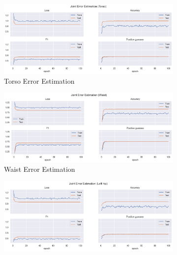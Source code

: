 \begin{figure}[!ht]
  \centering
  \begin{subfigure}[b]{0.47\linewidth}
      \centering
      \includegraphics[width=\textwidth]{figures/Results/v1_bs_60_is_64_e_100/jt/Torso_ErrorEstimation.png}
      \caption{Torso Error Estimation}
      \label{fig:v1_torso_jt_ee}
  \end{subfigure}
  \hfill
  \begin{subfigure}[b]{0.47\linewidth}
    \centering
    \includegraphics[width=\textwidth]{figures/Results/v1_bs_60_is_64_e_100/jt/Waist_ErrorEstimation.png}
    \caption{Waist Error Estimation}
    \label{fig:v1_waist_jt_ee}
  \end{subfigure}
  \hfill
  \begin{subfigure}[b]{0.47\linewidth}
      \centering
      \includegraphics[width=\textwidth]{figures/Results/v1_bs_60_is_64_e_100/jt/Left hip_ErrorEstimation.png}

\end{subfigure}
\end{figure}
